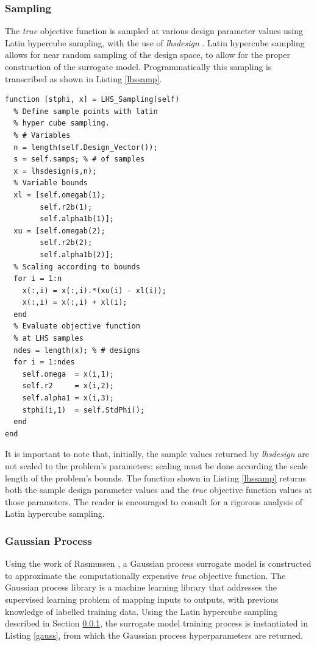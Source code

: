 \documentclass{article}
\begin{document}
\subsubsection{Sampling} \label{sec:lhs}
The \textit{true} objective function is sampled at various design parameter values using Latin hypercube sampling, with the use of \textit{lhsdesign} \cite{Matlab}. Latin hypercube sampling allows for near random sampling of the design space, to allow for the proper construction of the surrogate model. Programmatically this sampling is transcribed as shown in Listing \ref{lhssamp}.
\begin{lstlisting}[caption=Latin Hypercube Sampling, label=lhssamp]
function [stphi, x] = LHS_Sampling(self)
  % Define sample points with latin
  % hyper cube sampling.
  % # Variables
  n = length(self.Design_Vector());
  s = self.samps; % # of samples
  x = lhsdesign(s,n);
  % Variable bounds
  xl = [self.omegab(1);
        self.r2b(1);
        self.alpha1b(1)];
  xu = [self.omegab(2);
        self.r2b(2);
        self.alpha1b(2)];
  % Scaling according to bounds
  for i = 1:n
    x(:,i) = x(:,i).*(xu(i) - xl(i));
    x(:,i) = x(:,i) + xl(i);
  end
  % Evaluate objective function
  % at LHS samples
  ndes = length(x); % # designs
  for i = 1:ndes
    self.omega  = x(i,1);
    self.r2     = x(i,2);
    self.alpha1 = x(i,3);
    stphi(i,1)  = self.StdPhi();
  end
end
\end{lstlisting}
It is important to note that, initially, the sample values returned by \textit{lhsdesign} are not scaled to the problem's parameters; scaling must be done according the scale length of the problem's bounds. The function shown in Listing \ref{lhssamp} returns both the sample design parameter values and the \textit{true} objective function values at those parameters. The reader is encouraged to consult \cite{Helton2003} for a rigorous analysis of Latin hypercube sampling.

\subsubsection{Gaussian Process}
Using the work of Rasmussen \cite{Rasmussen2004}, a Gaussian process surrogate model is constructed to approximate the computationally expensive \textit{true} objective function. The Gaussian process library is a machine learning library that addresses the supervised learning problem of mapping inputs to outputs, with previous knowledge of labelled training data. Using the Latin hypercube sampling described in Section \ref{sec:lhs}, the surrogate model training process is instantiated in Listing \ref{gauss}, from which the Gaussian process hyperparameters are returned. 
\end{document}
